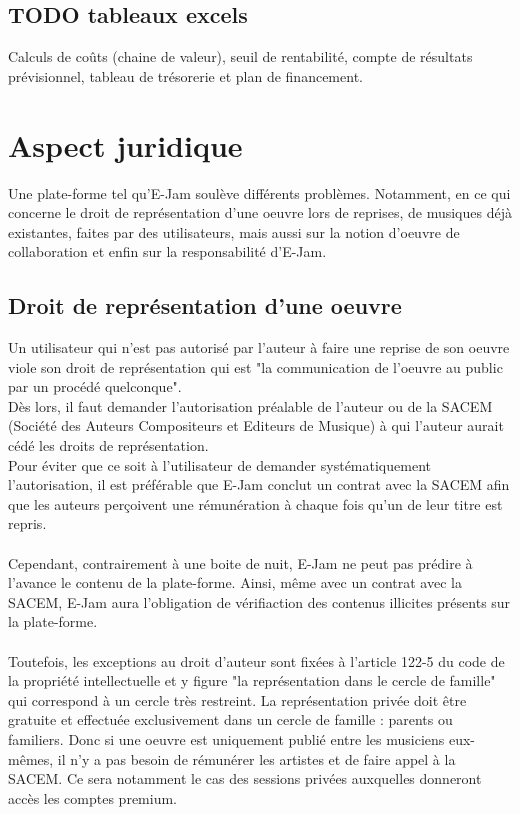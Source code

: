 \documentclass[a4,12pt]{article}
\begin{document}
\subsection{TODO tableaux excels}

Calculs de coûts (chaine de valeur), seuil de rentabilité, compte de résultats prévisionnel, tableau de trésorerie et plan de financement.\\

\section{Aspect juridique}
Une plate-forme tel qu'E-Jam soulève différents problèmes. Notamment, en ce qui concerne le droit de représentation d'une oeuvre lors de reprises, de musiques déjà existantes, faites par des utilisateurs, mais aussi sur la notion d'oeuvre de collaboration et enfin sur la responsabilité d'E-Jam.

\subsection{Droit de représentation d'une oeuvre}

Un utilisateur qui n'est pas autorisé par l'auteur à faire une reprise de son oeuvre viole son droit de représentation qui est "la communication de l'oeuvre au public par un procédé quelconque".\\
Dès lors, il faut demander l'autorisation préalable de l'auteur ou de la SACEM (Société des Auteurs Compositeurs et Editeurs de Musique) à qui l'auteur aurait cédé les droits de représentation.\\
Pour éviter que ce soit à l'utilisateur de demander systématiquement l'autorisation, il est préférable que E-Jam conclut un contrat avec la SACEM afin que les auteurs perçoivent une rémunération à chaque fois qu'un de leur titre est repris.\\
\\
Cependant, contrairement à une boite de nuit, E-Jam ne peut pas prédire à l'avance le contenu de la plate-forme. Ainsi, même avec un contrat avec la SACEM, E-Jam aura l'obligation de vérifiaction des contenus illicites présents sur la plate-forme.\\
\\
Toutefois, les exceptions au droit d'auteur sont fixées à l'article 122-5 du code de la propriété intellectuelle et y figure "la représentation dans le cercle de famille" qui correspond à un cercle très restreint. La représentation privée doit être gratuite et effectuée exclusivement dans un cercle de famille : parents ou familiers. Donc si une oeuvre est uniquement publié entre les musiciens eux-mêmes, il n'y a pas besoin de rémunérer les artistes et de faire appel à la SACEM. Ce sera notamment le cas des sessions privées auxquelles donneront accès les comptes premium.
\end{document}
